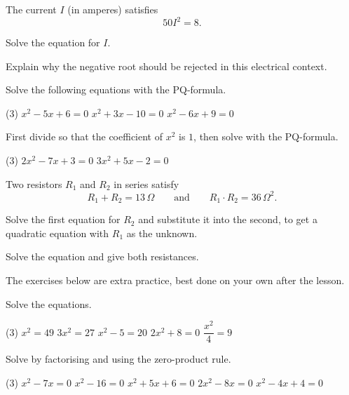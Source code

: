 
The current $I$ (in amperes) satisfies
\[
  50I^2 = 8.
\]
\begin{parts}
  \item Solve the equation for $I$.
  \item Explain why the negative root should be rejected in this electrical context.
\end{parts}

Solve the following equations with the PQ-formula.
\begin{delar}(3)
  \task $x^2 - 5x + 6 = 0$
  \task $x^2 + 3x - 10 = 0$
  \task $x^2 - 6x + 9 = 0$
\end{delar}

First divide so that the coefficient of $x^2$ is $1$, then solve with the PQ-formula.
\begin{delar}(3)
  \task $2x^2 - 7x + 3 = 0$
  \task $3x^2 + 5x - 2 = 0$
\end{delar}

Two resistors $R_1$ and $R_2$ in series satisfy
\[
  R_1 + R_2 = 13\,\Omega \qquad \text{and} \qquad R_1 \cdot R_2 = 36\,\Omega^2.
\]
\begin{parts}
  \item Solve the first equation for $R_2$ and substitute it into the second, to get a
    quadratic equation with $R_1$ as the unknown.
  \item Solve the equation and give both resistances.
\end{parts}

The exercises below are extra practice, best done on your own after the lesson.

Solve the equations.
\begin{delar}(3)
  \task $x^2 = 49$
  \task $3x^2 = 27$
  \task $x^2 - 5 = 20$
  \task $2x^2 + 8 = 0$
  \task $\dfrac{x^2}{4} = 9$
\end{delar}

Solve by factorising and using the zero-product rule.
\begin{delar}(3)
  \task $x^2 - 7x = 0$
  \task $x^2 - 16 = 0$
  \task $x^2 + 5x + 6 = 0$
  \task $2x^2 - 8x = 0$
  \task $x^2 - 4x + 4 = 0$
\end{delar}

